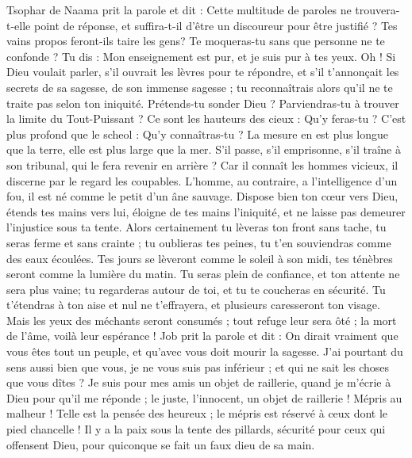 \begin{multicols}{2}
\VerseOne{}Tsophar de Naama prit la parole et dit :
Cette multitude de paroles ne trouvera-t-elle point de réponse, et suffira-t-il d'être un discoureur pour être justifié ?
Tes vains propos feront-ils taire les gens? Te moqueras-tu sans que personne ne te confonde ?
Tu dis : Mon enseignement est pur, et je suis pur à tes yeux.
Oh ! Si Dieu voulait parler, s'il ouvrait les lèvres pour te répondre,
et s'il t'annonçait les secrets de sa sagesse, de son immense sagesse ; tu reconnaîtrais alors qu'il ne te traite pas selon ton iniquité.
Prétends-tu sonder Dieu ? Parviendras-tu à trouver la limite du Tout-Puissant ?
Ce sont les hauteurs des cieux : Qu'y feras-tu ? C'est plus profond que le scheol : Qu'y connaîtras-tu ?
La mesure en est plus longue que la terre, elle est plus large que la mer.
S'il passe, s'il emprisonne, s'il traîne à son tribunal, qui le fera revenir en arrière ?
Car il connaît les hommes vicieux, il discerne par le regard les coupables.
L'homme, au contraire, a l'intelligence d'un fou, il est né comme le petit d'un âne sauvage.
Dispose bien ton cœur vers Dieu, étends tes mains vers lui,
éloigne de tes mains l'iniquité, et ne laisse pas demeurer l'injustice sous ta tente.
Alors certainement tu lèveras ton front sans tache, tu seras ferme et sans crainte ;
tu oublieras tes peines, tu t'en souviendras comme des eaux écoulées.
Tes jours se lèveront comme le soleil à son midi, tes ténèbres seront comme la lumière du matin.
Tu seras plein de confiance, et ton attente ne sera plus vaine; tu regarderas autour de toi, et tu te coucheras en sécurité.
Tu t'étendras à ton aise et nul ne t'effrayera, et plusieurs caresseront ton visage.
Mais les yeux des méchants seront consumés ; tout refuge leur sera ôté ; la mort de l'âme, voilà leur espérance !
\VerseOne{}Job prit la parole et dit :
On dirait vraiment que vous êtes tout un peuple, et qu'avec vous doit mourir la sagesse.
J'ai pourtant du sens aussi bien que vous, je ne vous suis pas inférieur ; et qui ne sait les choses que vous dîtes ?
Je suis pour mes amis un objet de raillerie, quand je m'écrie à Dieu pour qu'il me réponde ; le juste, l'innocent, un objet de raillerie !
Mépris au malheur ! Telle est la pensée des heureux ; le mépris est réservé à ceux dont le pied chancelle !
Il y a la paix sous la tente des pillards, sécurité pour ceux qui offensent Dieu, pour quiconque se fait un faux dieu de sa main.

\end{multicols}
